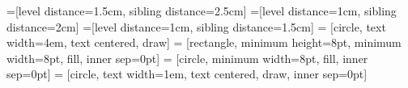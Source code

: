 \documentclass[11pt]{article}
\begin{document}
=[level distance=1.5cm, sibling distance=2.5cm]
=[level distance=1cm, sibling distance=2cm]
=[level distance=1cm, sibling distance=1.5cm]
 = [circle, text width=4em, text centered, draw]
 = [rectangle, minimum height=8pt, minimum width=8pt, fill, inner sep=0pt]
 = [circle, minimum width=8pt, fill, inner sep=0pt]
 = [circle, text width=1em, text centered, draw, inner sep=0pt]

\end{document}
